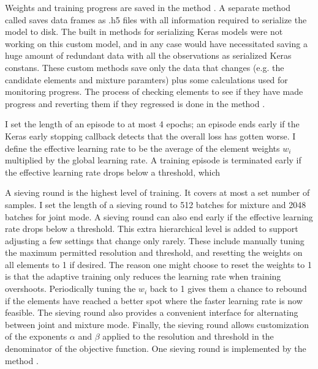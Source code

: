 Weights and training progress are saved in the method .
A separate method called  saves data frames as .h5 files with all information required to serialize the model to disk.
The built in methods for serializing Keras models were not working on this custom model, 
and in any case would have necessitated saving a huge amount of redundant data with all the observations as serialized Keras constans.
These custom methods save only the data that changes (e.g. the candidate elements and mixture paramters) plus some calculations used for monitoring progress.
The process of checking elements to see if they have made progress and reverting them if they regressed 
is done in the method .

I set the length of an episode to at most 4 epochs; an episode ends early if the Keras early stopping callback detects that the overall loss has gotten worse.
I define the effective learning rate to be the average of the element weights $w_i$ multiplied by the global learning rate.
A training episode is terminated early if the effective learning rate drops below a threshold, which 

A sieving round is the highest level of training.
It covers at most a set number of samples.
I set the length of a sieving round to 512 batches for mixture and 2048 batches for joint mode.
A sieving round can also end early if the effective learning rate drops below a threshold.
This extra hierarchical level is added to support adjusting a few settings that change only rarely.
These include manually tuning the maximum permitted resolution and threshold, and resetting the weights on all elements to 1 if desired.
The reason one might choose to reset the weights to 1 is that the adaptive training only reduces the learning rate when training overshoots.
Periodically tuning the $w_i$ back to 1 gives them a chance to rebound if the elements have reached a better spot where the faster
learning rate is now feasible.
The sieving round also provides a convenient interface for alternating between joint and mixture mode.
Finally, the sieving round allows customization of the exponents $\alpha$ and $\beta$ applied to the resolution and threshold 
in the denominator of the objective function.
One sieving round is implemented by the method .

